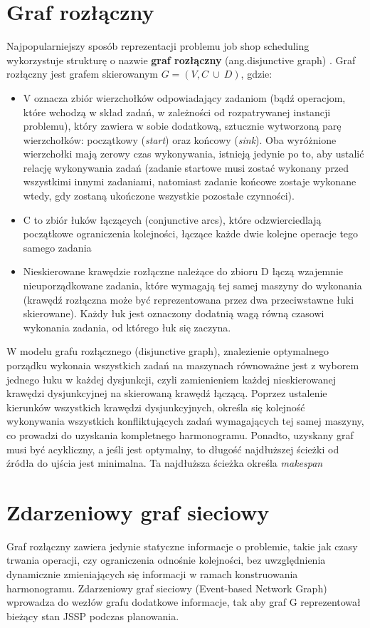 \documentclass[12pt, a4paper]{report}
\begin{document}
  \section{Graf rozłączny}
  Najpopularniejszy sposób reprezentacji problemu job shop scheduling wykorzystuje strukturę 
  o nazwie \textbf{graf rozłączny} (ang.disjunctive graph) \cite{disjunctive_graph}.
  Graf rozłączny jest grafem skierowanym $ G =(V,C \: \cup \: D)$, gdzie:
  \begin{itemize}
    \item V oznacza zbiór 
    wierzchołków odpowiadający zadaniom (bądź operacjom, które wchodzą w skład zadań, w zależności od rozpatrywanej instancji problemu),
    który zawiera w sobie dodatkową, sztucznie wytworzoną parę wierzchołków: początkowy (\textit{start}) oraz końcowy (\textit{sink}). 
    Oba wyróżnione wierzchołki mają zerowy czas wykonywania, istnieją jedynie po to, aby ustalić relację wykonywania zadań (zadanie startowe
    musi zostać wykonany przed wszystkimi innymi zadaniami, natomiast zadanie końcowe zostaje wykonane wtedy, gdy zostaną ukończone wszystkie pozostałe czynności).
    \item C to zbiór łuków łączących (conjunctive arcs), 
    które odzwierciedlają początkowe ograniczenia kolejności, 
    łączące każde dwie kolejne operacje tego samego zadania
    \item Nieskierowane krawędzie rozłączne należące do zbioru D 
    łączą wzajemnie nieuporządkowane zadania, 
    które wymagają tej samej maszyny do wykonania 
    (krawędź rozłączna może być reprezentowana przez dwa przeciwstawne łuki skierowane). 
    Każdy łuk jest oznaczony dodatnią wagą równą czasowi wykonania zadania, 
    od którego łuk się zaczyna.
  \end{itemize}
  W modelu grafu rozłącznego (disjunctive graph), znalezienie optymalnego 
  porządku wykonaia wszystkich zadań na maszynach
  równoważne jest z wyborem jednego łuku w każdej dysjunkcji, czyli zamienieniem 
  każdej nieskierowanej krawędzi dysjunkcyjnej na skierowaną krawędź łączącą. 
  Poprzez ustalenie kierunków wszystkich krawędzi dysjunkcyjnych, 
  określa się kolejność wykonywania wszystkich konfliktujących zadań wymagających 
  tej samej maszyny, co prowadzi do uzyskania kompletnego harmonogramu.
  Ponadto, uzyskany graf musi być acykliczny, a jeśli jest optymalny, 
  to długość najdłuższej ścieżki od źródła do ujścia jest minimalna. 
  Ta najdłuższa ścieżka określa \textit{makespan}

  \section{Zdarzeniowy graf sieciowy}
  Graf rozłączny zawiera jedynie statyczne informacje o problemie, takie jak czasy trwania
  operacji, czy ograniczenia odnośnie kolejności, bez uwzględnienia dynamicznie
  zmieniających się informacji w ramach konstruowania harmonogramu. 
  Zdarzeniowy graf sieciowy (Event-based Network Graph) wprowadza do wezłów grafu dodatkowe 
  informacje, tak aby graf G reprezentował bieżący stan JSSP podczas planowania.
  \cite{fjssp} \cite{graf_sieciowy}
\end{document}

